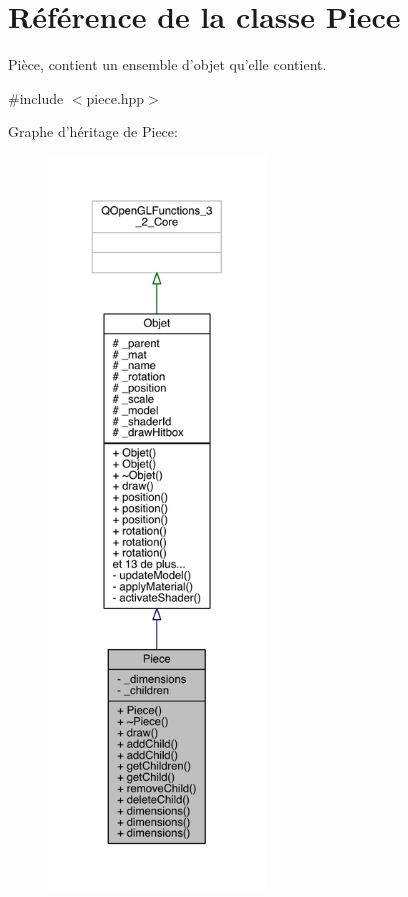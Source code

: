 \hypertarget{class_piece}{\section{Référence de la classe Piece}
\label{class_piece}
}


Pièce, contient un ensemble d'objet qu'elle contient.  




{\ttfamily \#include $<$piece.\+hpp$>$}



Graphe d'héritage de Piece\+:
\nopagebreak
\begin{figure}[H]
\begin{center}
\leavevmode
\includegraphics[height=550pt]{class_piece__inherit__graph}
\end{center}
\end{figure}


